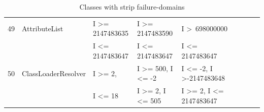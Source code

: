 \documentclass[runningheads,a4paper]{llncs}
\begin{document}
\begin{table}[h]
{{\begin{tabular}{|l|l|l|l|l|l|l|l|l|}
49	& AttributeList				& I \textgreater= 2147483635				& I \textgreater= 2147483590			& I \textgreater~698000000					\\ 
	&                                             & I \textless= 2147483647					& I \textless= 2147483647				& I \textless= 2147483647 					\\
50	& ClassLoaderResolver		&  I \textgreater= 2,						       & I \textgreater= 500, I \textless= -2			& I \textless= -2, I \textgreater -2147483648  								  \\ 
	&                                             &  I \textless= 18						       & I \textgreater= 2, I \textless= 505			& I \textgreater= 2, I \textless= 2147483647			   					  \\
	

\hline
\end{tabular}
}
}
\bigskip
\caption{Classes with strip failure-domains}
\label{table:stripDomains}
\end{table}

















\begin{table}[h]
\centering
\noindent{}
\bigskip
\caption{Classes with point failure-domains}
\label{table:pointDomains}
\end{table}
\end{document}

